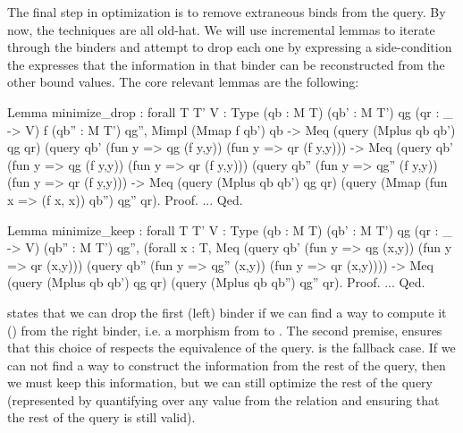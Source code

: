 \documentclass[preprint]{sigplanconf}
\newcommand{\greg}[1]{\textcolor{blue}{GREG: #1}}
\begin{document}
The final step in optimization is to remove extraneous binds from the query.
By now, the techniques are all old-hat.
We will use incremental lemmas to iterate through the binders and attempt to drop each one by expressing a side-condition the expresses that the information in that binder can be reconstructed from the other bound values.
The core relevant lemmas are the following:
\begin{coq}
Lemma minimize_drop
: forall {T T' V : Type} (qb : M T) (qb' : M T') qg (qr : _ -> V) f (qb'' : M T') qg'',
  Mimpl (Mmap f qb') qb ->
  Meq (query (Mplus qb qb') qg qr)
      (query qb' (fun y => qg (f y,y)) (fun y => qr (f y,y))) ->
  Meq (query qb' (fun y => qg (f y,y)) (fun y => qr (f y,y)))
      (query qb'' (fun y => qg'' (f y,y)) (fun y => qr (f y,y))) ->
  Meq (query (Mplus qb qb') qg qr)
      (query (Mmap (fun x => (f x, x)) qb'') qg'' qr).
Proof. ... Qed.

Lemma minimize_keep
: forall {T T' V : Type} (qb : M T) (qb' : M T') qg (qr : _ -> V) (qb'' : M T') qg'',
  (forall x : T,
     Meq (query qb' (fun y => qg (x,y)) (fun y => qr (x,y)))
         (query qb'' (fun y => qg'' (x,y)) (fun y => qr (x,y)))) ->
  Meq (query (Mplus qb qb') qg qr)
      (query (Mplus qb qb'') qg'' qr).
Proof. ... Qed.
\end{coq}
 states that we can drop the first (left) binder if we can find a way to compute it () from the right binder, i.e. a morphism from  to .
The second premise, ensures that this choice of  respects the equivalence of the query.
 is the fallback case.
If we can not find a way to construct the information from the rest of the query, then we must keep this information, but we can still optimize the rest of the query (represented by quantifying over any value from the relation and ensuring that the rest of the query is still valid).

\end{document}
